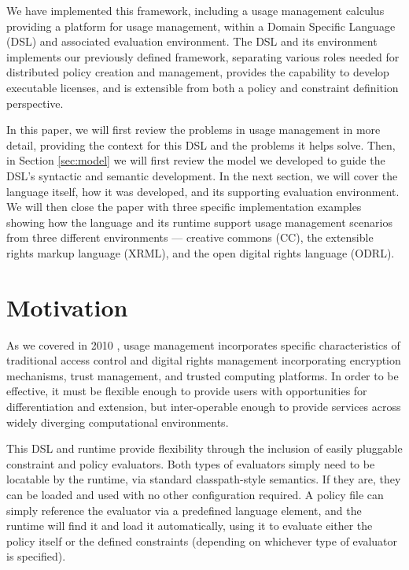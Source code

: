 We have implemented this framework, including a usage management calculus providing a platform for usage management, within a Domain Specific Language (DSL) and associated evaluation environment. The DSL and its environment implements our previously defined framework, separating various roles needed for distributed policy creation and management, provides the capability to develop executable licenses, and is extensible from both a policy and constraint definition perspective.

In this paper, we will first review the problems in usage management in more detail, providing the context for this DSL and the problems it helps solve.  Then, in Section \ref{sec:model} we will first review the model we developed to guide the DSL's syntactic and semantic development. In the next section, we will cover the language itself, how it was developed, and its supporting evaluation environment.  We will then close the paper with three specific implementation examples showing how the language and its runtime support usage management scenarios from three different environments --- creative commons (CC), the extensible rights markup language (XRML), and the open digital rights language (ODRL).

\section{Motivation}\label{sec:motivation}
As we covered in 2010 \cite{Jamkhedkar:2010:IUM:1866870.1866885}, usage management incorporates specific characteristics of traditional access control and digital rights management incorporating encryption mechanisms, trust management, and trusted computing platforms.  In order to be effective, it must be flexible enough to provide users with opportunities for differentiation and extension, but inter-operable enough to provide services across widely diverging computational environments.

This DSL and runtime provide flexibility through the inclusion of easily pluggable constraint and policy evaluators.  Both types of evaluators simply need to be locatable by the runtime, via standard classpath-style semantics.  If they are, they can be loaded and used with no other configuration required.  A policy file can simply reference the evaluator via a predefined language element, and the runtime will find it and load it automatically, using it to evaluate either the policy itself or the defined constraints (depending on whichever type of evaluator is specified).

